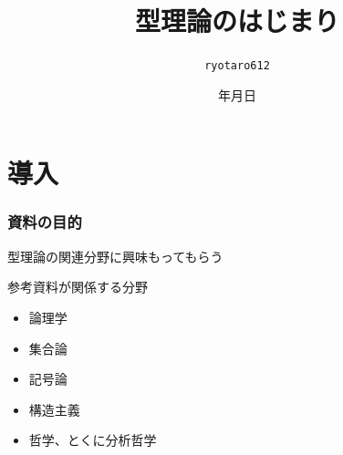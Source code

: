 \documentclass[unicode, 14pt, aspectratio=169]{beamer}
\date{\number\year 年\number\month 月\number\day 日}
\title{型理論のはじまり}
\author{\texttt{ryotaro612}}
\begin{document}
\begin{frame}
\titlepage
\end{frame}
\section{導入}
\begin{frame}
  \frametitle{資料の目的}
  {\large 型理論の関連分野に興味もってもらう}
  \par
  \vspace{16pt}
  参考資料が関係する分野
  \begin{itemize}
  \item 論理学
  \item 集合論
  \item 記号論
  \item 構造主義
  \item 哲学、とくに分析哲学
  \end{itemize}
\end{frame}
\end{document}
